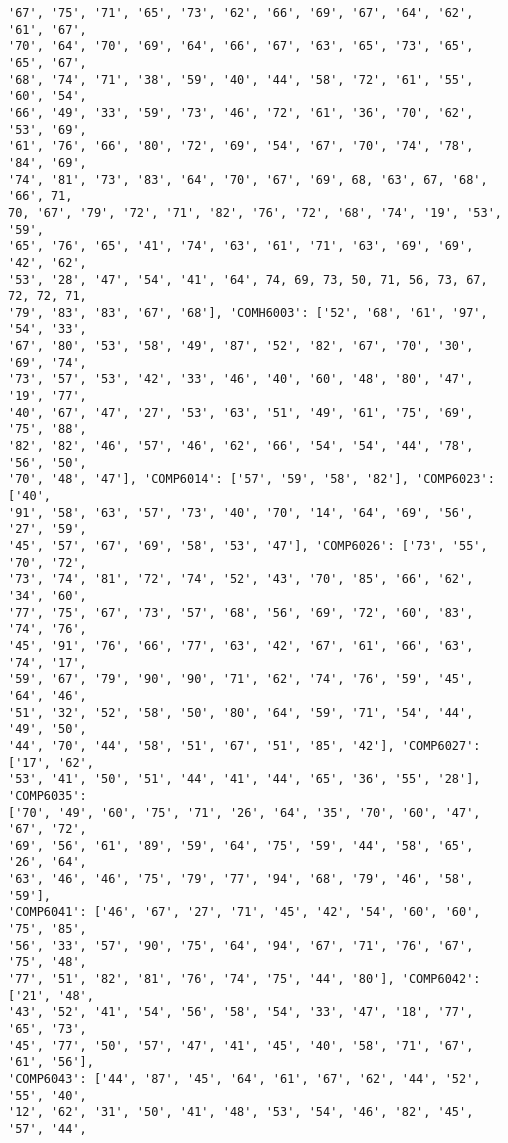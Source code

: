 \documentclass[11pt]{article}
\begin{document}
\begin{Verbatim}[commandchars=\\\{\}]
'67', '75', '71', '65', '73', '62', '66', '69', '67', '64', '62', '61', '67',
'70', '64', '70', '69', '64', '66', '67', '63', '65', '73', '65', '65', '67',
'68', '74', '71', '38', '59', '40', '44', '58', '72', '61', '55', '60', '54',
'66', '49', '33', '59', '73', '46', '72', '61', '36', '70', '62', '53', '69',
'61', '76', '66', '80', '72', '69', '54', '67', '70', '74', '78', '84', '69',
'74', '81', '73', '83', '64', '70', '67', '69', 68, '63', 67, '68', '66', 71,
70, '67', '79', '72', '71', '82', '76', '72', '68', '74', '19', '53', '59',
'65', '76', '65', '41', '74', '63', '61', '71', '63', '69', '69', '42', '62',
'53', '28', '47', '54', '41', '64', 74, 69, 73, 50, 71, 56, 73, 67, 72, 72, 71,
'79', '83', '83', '67', '68'], 'COMH6003': ['52', '68', '61', '97', '54', '33',
'67', '80', '53', '58', '49', '87', '52', '82', '67', '70', '30', '69', '74',
'73', '57', '53', '42', '33', '46', '40', '60', '48', '80', '47', '19', '77',
'40', '67', '47', '27', '53', '63', '51', '49', '61', '75', '69', '75', '88',
'82', '82', '46', '57', '46', '62', '66', '54', '54', '44', '78', '56', '50',
'70', '48', '47'], 'COMP6014': ['57', '59', '58', '82'], 'COMP6023': ['40',
'91', '58', '63', '57', '73', '40', '70', '14', '64', '69', '56', '27', '59',
'45', '57', '67', '69', '58', '53', '47'], 'COMP6026': ['73', '55', '70', '72',
'73', '74', '81', '72', '74', '52', '43', '70', '85', '66', '62', '34', '60',
'77', '75', '67', '73', '57', '68', '56', '69', '72', '60', '83', '74', '76',
'45', '91', '76', '66', '77', '63', '42', '67', '61', '66', '63', '74', '17',
'59', '67', '79', '90', '90', '71', '62', '74', '76', '59', '45', '64', '46',
'51', '32', '52', '58', '50', '80', '64', '59', '71', '54', '44', '49', '50',
'44', '70', '44', '58', '51', '67', '51', '85', '42'], 'COMP6027': ['17', '62',
'53', '41', '50', '51', '44', '41', '44', '65', '36', '55', '28'], 'COMP6035':
['70', '49', '60', '75', '71', '26', '64', '35', '70', '60', '47', '67', '72',
'69', '56', '61', '89', '59', '64', '75', '59', '44', '58', '65', '26', '64',
'63', '46', '46', '75', '79', '77', '94', '68', '79', '46', '58', '59'],
'COMP6041': ['46', '67', '27', '71', '45', '42', '54', '60', '60', '75', '85',
'56', '33', '57', '90', '75', '64', '94', '67', '71', '76', '67', '75', '48',
'77', '51', '82', '81', '76', '74', '75', '44', '80'], 'COMP6042': ['21', '48',
'43', '52', '41', '54', '56', '58', '54', '33', '47', '18', '77', '65', '73',
'45', '77', '50', '57', '47', '41', '45', '40', '58', '71', '67', '61', '56'],
'COMP6043': ['44', '87', '45', '64', '61', '67', '62', '44', '52', '55', '40',
'12', '62', '31', '50', '41', '48', '53', '54', '46', '82', '45', '57', '44',

\end{Verbatim}
\end{document}
